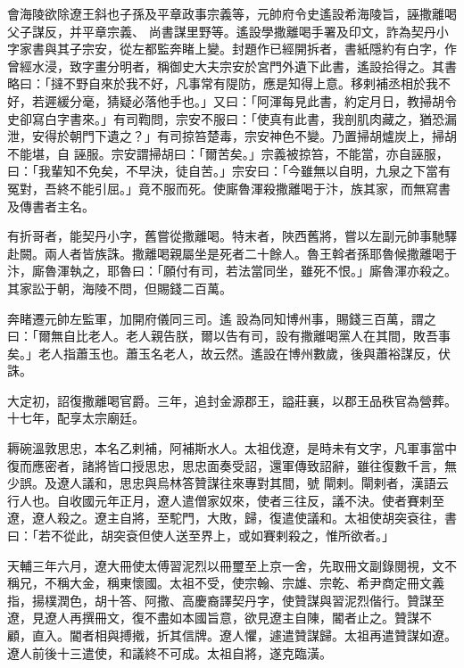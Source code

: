 \begin{pinyinscope}
 會海陵欲除遼王斜也子孫及平章政事宗義等，元帥府令史遙設希海陵旨，誣撒離喝父子謀反，并平章宗義、
 尚書謀里野等。遙設學撒離喝手署及印文，詐為契丹小字家書與其子宗安，從左都監奔睹上變。封題作已經開拆者，書紙隱約有白字，作曾經水浸，致字畫分明者，稱御史大夫宗安於宮門外遺下此書，遙設拾得之。其書略曰：「撻不野自來於我不好，凡事常有隄防，應是知得上意。移剌補丞相於我不好，若遲緩分毫，猜疑必落他手也。」又曰：「阿渾每見此書，約定月日，教掃胡令史卻寫白字書來。」有司鞫問，宗安不服曰：「使真有此書，我剖肌肉藏之，猶恐漏泄，安得於朝門下遺之？」有司掠笞楚毒，宗安神色不變。乃置掃胡爐炭上，掃胡不能堪，自
 誣服。宗安謂掃胡曰：「爾苦矣。」宗義被掠笞，不能當，亦自誣服，曰：「我輩知不免矣，不早決，徒自苦。」宗安曰：「今雖無以自明，九泉之下當有冤對，吾終不能引屈。」竟不服而死。使廝魯渾殺撒離喝于汴，族其家，而無寫書及傳書者主名。



 有折哥者，能契丹小字，舊嘗從撒離喝。特末者，陜西舊將，嘗以左副元帥事馳驛赴闕。兩人者皆族誅。撒離喝親屬坐是死者二十餘人。魯王斡者孫耶魯候撒離喝于汴，廝魯渾執之，耶魯曰：「願付有司，若法當同坐，雖死不恨。」廝魯渾亦殺之。其家訟于朝，海陵不問，但賜錢二百萬。



 奔睹遷元帥左監軍，加開府儀同三司。遙
 設為同知博州事，賜錢三百萬，謂之曰：「爾無自比老人。老人親告朕，爾以告有司，設有撒離喝黨人在其間，敗吾事矣。」老人指蕭玉也。蕭玉名老人，故云然。遙設在博州數歲，後與蕭裕謀反，伏誅。



 大定初，詔復撒離喝官爵。三年，追封金源郡王，謚莊襄，以郡王品秩官為營葬。十七年，配享太宗廟廷。



 耨碗溫敦思忠，本名乙剌補，阿補斯水人。太祖伐遼，是時未有文字，凡軍事當中復而應密者，諸將皆口授思忠，思忠面奏受詔，還軍傳致詔辭，雖往復數千言，無少誤。及遼人議和，思忠與烏林答贊謀往來專對其間，號
 閘剌。閘剌者，漢語云行人也。自收國元年正月，遼人遣僧家奴來，使者三往反，議不決。使者賽剌至遼，遼人殺之。遼主自將，至駝門，大敗，歸，復遣使議和。太祖使胡突袞往，書曰：「若不從此，胡突袞但使人送至界上，或如賽剌殺之，惟所欲者。」



 天輔三年六月，遼大冊使太傅習泥烈以冊璽至上京一舍，先取冊文副錄閱視，文不稱兄，不稱大金，稱東懷國。太祖不受，使宗翰、宗雄、宗乾、希尹商定冊文義指，揚樸潤色，胡十答、阿撒、高慶裔譯契丹字，使贊謀與習泥烈偕行。贊謀至遼，見遼人再撰冊文，復不盡如本國旨意，欲見遼主自陳，閽者止之。贊謀不
 顧，直入。閽者相與搏撠，折其信牌。遼人懼，遽遣贊謀歸。太祖再遣贊謀如遼。遼人前後十三遣使，和議終不可成。太祖自將，遂克臨潢。




\end{pinyinscope}
